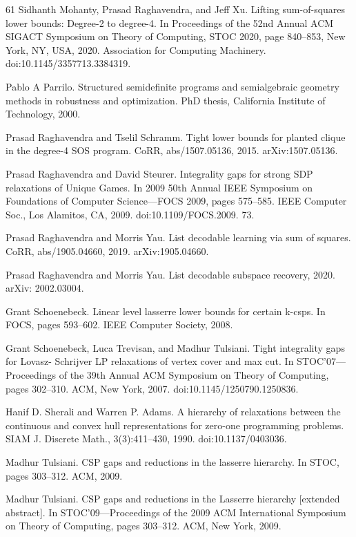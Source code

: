 \documentclass[10pt,a4paper]{article}
\theoremstyle{definition}
\begin{document}
\begin{thebibliography}{61}
Sidhanth Mohanty, Prasad Raghavendra, and Jeff Xu. Lifting sum-of-squares lower bounds: Degree-2 to degree-4. In Proceedings of the 52nd Annual ACM SIGACT Symposium on Theory of Computing, STOC 2020, page 840–853, New York, NY, USA, 2020. Association for Computing Machinery. doi:10.1145/3357713.3384319.

Pablo A Parrilo. Structured semidefinite programs and semialgebraic geometry methods in robustness and optimization. PhD thesis, California Institute of Technology, 2000.

Prasad Raghavendra and Tselil Schramm. Tight lower bounds for planted clique in the degree-4 SOS program. CoRR, abs/1507.05136, 2015. arXiv:1507.05136.

Prasad Raghavendra and David Steurer. Integrality gaps for strong SDP relaxations of Unique Games. In 2009 50th Annual IEEE Symposium on Foundations of Computer Science—FOCS 2009, pages 575–585. IEEE Computer Soc., Los Alamitos, CA, 2009. doi:10.1109/FOCS.2009. 73.

Prasad Raghavendra and Morris Yau. List decodable learning via sum of squares. CoRR, abs/1905.04660, 2019. arXiv:1905.04660.

Prasad Raghavendra and Morris Yau. List decodable subspace recovery, 2020. arXiv: 2002.03004.

Grant Schoenebeck. Linear level lasserre lower bounds for certain k-csps. In FOCS, pages 593–602. IEEE Computer Society, 2008.

Grant Schoenebeck, Luca Trevisan, and Madhur Tulsiani. Tight integrality gaps for Lovasz- Schrijver LP relaxations of vertex cover and max cut. In STOC’07—Proceedings of the 39th Annual ACM Symposium on Theory of Computing, pages 302–310. ACM, New York, 2007. doi:10.1145/1250790.1250836.

Hanif D. Sherali and Warren P. Adams. A hierarchy of relaxations between the continuous and convex hull representations for zero-one programming problems. SIAM J. Discrete Math., 3(3):411–430, 1990. doi:10.1137/0403036.

Madhur Tulsiani. CSP gaps and reductions in the lasserre hierarchy. In STOC, pages 303–312. ACM, 2009.

Madhur Tulsiani. CSP gaps and reductions in the Lasserre hierarchy [extended abstract]. In STOC’09—Proceedings of the 2009 ACM International Symposium on Theory of Computing, pages 303–312. ACM, New York, 2009.
\end{thebibliography}
\end{document}
